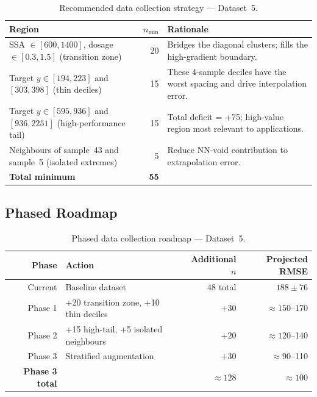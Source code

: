 \documentclass[12pt,a4paper]{article}
\begin{document}
\begin{table}[h]
\centering
\caption{Recommended data collection strategy — Dataset~5.}
\label{tab:ds5_recommendations}
\small
\begin{tabular}{p{4.5cm}rp{7cm}}
\toprule
Region & $n_\text{min}$ & Rationale \\
\midrule
SSA $\in [600,1400]$, dosage $\in [0.3,1.5]$
(transition zone) &
20 &
Bridges the diagonal clusters; fills the high-gradient
boundary. \\
\addlinespace
Target $y \in [194,223]$ and $[303,398]$
(thin deciles) &
15 &
These 4-sample deciles have the worst spacing and drive
interpolation error. \\
\addlinespace
Target $y \in [595,936]$ and $[936,2251]$
(high-performance tail) &
15 &
Total deficit = +75; high-value region most relevant to
applications. \\
\addlinespace
Neighbours of sample~43 and sample~5
(isolated extremes) &
5 &
Reduce NN-void contribution to extrapolation error. \\
\midrule
\textbf{Total minimum} & \textbf{55} & \\
\bottomrule
\end{tabular}
\end{table}

\subsection{Phased Roadmap}

\begin{table}[h]
\centering
\caption{Phased data collection roadmap — Dataset~5.}
\label{tab:ds5_roadmap}
\begin{tabular}{rlrr}
\toprule
Phase & Action & Additional $n$ & Projected RMSE \\
\midrule
Current & Baseline dataset & 48 total & $188 \pm 76$ \\
Phase 1 & +20 transition zone, +10 thin deciles & $+30$ & $\approx 150$--170 \\
Phase 2 & +15 high-tail, +5 isolated neighbours  & $+20$ & $\approx 120$--140 \\
Phase 3 & Stratified augmentation                & $+30$ & $\approx 90$--110 \\
\midrule
\textbf{Phase 3 total} & & \textbf{$\approx 128$} & \textbf{$\approx 100$} \\
\bottomrule
\end{tabular}
\end{table}
\end{document}
